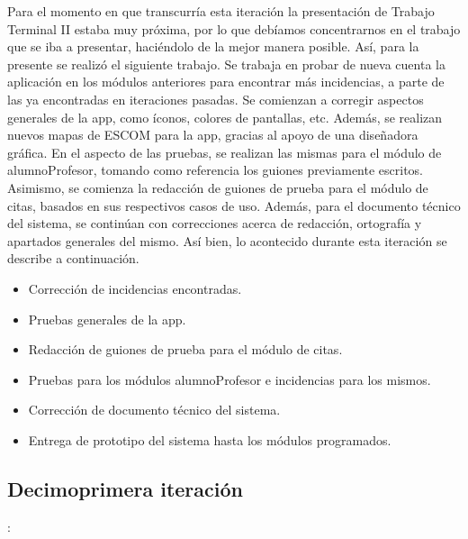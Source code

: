 \noindent
Para el momento en que transcurría esta iteración la presentación de Trabajo Terminal II estaba muy próxima, por lo que debíamos concentrarnos en el trabajo que se iba a presentar, haciéndolo de la mejor manera posible. Así, para la presente se realizó el siguiente trabajo. 
\newline
\newline
Se trabaja en probar de nueva cuenta la aplicación en los módulos anteriores para encontrar más incidencias, a parte de las ya encontradas en iteraciones pasadas. Se comienzan a corregir aspectos generales de la app, como íconos, colores de pantallas, etc. Además, se realizan nuevos mapas de ESCOM para la app, gracias al apoyo de una diseñadora gráfica.
\newline
En el aspecto de las pruebas, se realizan las mismas para el módulo de alumnoProfesor, tomando como referencia los guiones previamente escritos. Asimismo, se comienza la redacción de guiones de prueba para el módulo de citas, basados en sus respectivos casos de uso. 
\newline
Además, para el documento técnico del sistema, se continúan con correcciones acerca de redacción, ortografía y apartados generales del mismo.
\newline
Así bien, lo acontecido durante esta iteración se describe a continuación. 
\begin{itemize}
	\item Corrección de incidencias encontradas.
	\item Pruebas generales de la app. 
	\item Redacción de guiones de prueba para el módulo de citas.
	\item Pruebas para los módulos alumnoProfesor e incidencias para los mismos.
	\item Corrección de documento técnico del sistema.
	\item Entrega de prototipo del sistema hasta los módulos programados.
\end{itemize}


\subsection{Decimoprimera iteración}: 

